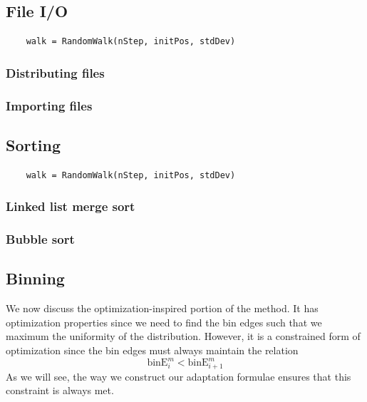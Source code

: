 \documentclass{article}
\begin{document}
\subsection{File I/O}

\begin{lstlisting}
	walk = RandomWalk(nStep, initPos, stdDev)
\end{lstlisting}

\subsubsection{Distributing files}
\subsubsection{Importing files}


\subsection{Sorting}

\begin{lstlisting}
	walk = RandomWalk(nStep, initPos, stdDev)
\end{lstlisting}

\subsubsection{Linked list merge sort}
\subsubsection{Bubble sort}


\subsection{Binning}
We now discuss the optimization-inspired portion of the method. It has optimization properties since we need to find the bin edges such that we maximum the uniformity of the distribution. However, it is a constrained form of optimization since the bin edges must always maintain the relation
\begin{equation}
	\textrm{binE}^m_i < \textrm{binE}^m_{i+1}
\end{equation}
As we will see, the way we construct our adaptation formulae ensures that this constraint is always met.
\end{document}

